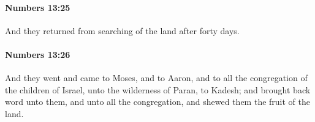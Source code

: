 		\paragraph{Numbers 13:25} %
			\label{NUMBERS-13-25}

			And they returned from searching of the land after forty days.


		\paragraph{Numbers 13:26} %
			\label{NUMBERS-13-26}

			And they went and came to Moses, and to Aaron, and to all the congregation of the children of Israel, unto the wilderness of Paran, to Kadesh; and brought back word unto them, and unto all the congregation, and shewed them the fruit of the land.


